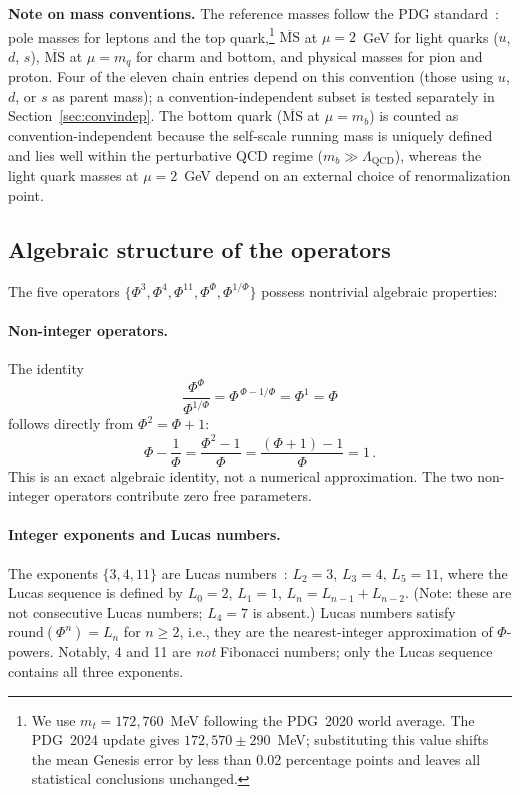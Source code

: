 \documentclass[11pt,a4paper]{article}
\begin{document}
\noindent
\textbf{Note on mass conventions.}
The reference masses follow the PDG standard~\cite{PDG2024}: pole masses for leptons
and the top quark,\footnote{We use $m_t = 172{,}760$~MeV following the
PDG~2020 world average. The PDG~2024 update gives
$172{,}570 \pm 290$~MeV; substituting this value shifts the mean Genesis
error by less than 0.02 percentage points and leaves all statistical
conclusions unchanged.} $\overline{\text{MS}}$ at $\mu = 2$~GeV for light
quarks ($u$, $d$, $s$), $\overline{\text{MS}}$ at $\mu = m_q$ for
charm and bottom, and physical masses for pion and proton. Four of the
eleven chain entries depend on this convention (those using $u$, $d$,
or $s$ as parent mass); a convention-independent
subset is tested separately in Section~\ref{sec:convindep}.
The bottom quark ($\overline{\text{MS}}$ at $\mu = m_b$) is counted
as convention-independent because the self-scale running mass is
uniquely defined and lies well within the perturbative QCD regime
($m_b \gg \Lambda_{\text{QCD}}$), whereas the light quark masses at
$\mu = 2$~GeV depend on an external choice of renormalization point.

\subsection{Algebraic structure of the operators}
\label{sec:algebra}

The five operators $\{\Phi^3, \Phi^4, \Phi^{11}, \Phi^\Phi,
\Phi^{1/\Phi}\}$ possess nontrivial algebraic properties:

\paragraph{Non-integer operators.}
The identity
\begin{equation}
  \frac{\Phi^\Phi}{\Phi^{1/\Phi}}
  = \Phi^{\,\Phi - 1/\Phi}
  = \Phi^1
  = \Phi
  \label{eq:selfref}
\end{equation}
follows directly from $\Phi^2 = \Phi + 1$:
\begin{equation}
  \Phi - \frac{1}{\Phi}
  = \frac{\Phi^2 - 1}{\Phi}
  = \frac{(\Phi + 1) - 1}{\Phi}
  = 1\,.
  \label{eq:selfref_proof}
\end{equation}
This is an exact algebraic identity, not a numerical approximation.
The two non-integer operators contribute zero free parameters.

\paragraph{Integer exponents and Lucas numbers.}
The exponents $\{3, 4, 11\}$ are Lucas numbers~\cite{Koshy2001}:
$L_2 = 3$, $L_3 = 4$, $L_5 = 11$, where the Lucas sequence is
defined by $L_0 = 2$, $L_1 = 1$, $L_n = L_{n-1} + L_{n-2}$.
(Note: these are not consecutive Lucas numbers; $L_4 = 7$ is absent.)
Lucas numbers satisfy $\text{round}(\Phi^n) = L_n$ for $n \geq 2$,
i.e., they are the nearest-integer approximation of $\Phi$-powers.
Notably, 4 and 11 are \emph{not} Fibonacci numbers; only the Lucas
sequence contains all three exponents.
\end{document}
